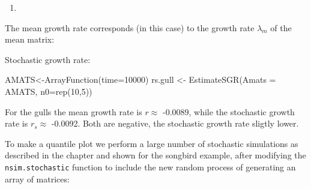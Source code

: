 \documentclass[
]{book}
\newenvironment{Shaded}{\begin{snugshade}}{\end{snugshade}}
\newcommand{\AttributeTok}[1]{\textcolor[rgb]{0.77,0.63,0.00}{#1}}
\newcommand{\DecValTok}[1]{\textcolor[rgb]{0.00,0.00,0.81}{#1}}
\newcommand{\FunctionTok}[1]{\textcolor[rgb]{0.00,0.00,0.00}{#1}}
\newcommand{\NormalTok}[1]{#1}
\newcommand{\OtherTok}[1]{\textcolor[rgb]{0.56,0.35,0.01}{#1}}
\newcommand{\SpecialCharTok}[1]{\textcolor[rgb]{0.00,0.00,0.00}{#1}}
\providecommand{\tightlist}{%
  \setlength{\itemsep}{0pt}\setlength{\parskip}{0pt}}
\begin{document}
\begin{enumerate}
\def\labelenumi{\arabic{enumi}.}
\setcounter{enumi}{2}
\tightlist
\item
\end{enumerate}

The mean growth rate corresponds (in this case) to the growth rate \(\lambda_m\) of the mean matrix:

\begin{Shaded}
\end{Shaded}

Stochastic growth rate:

\begin{Shaded}
\begin{Highlighting}[]
\NormalTok{AMATS}\OtherTok{\textless{}{-}}\FunctionTok{ArrayFunction}\NormalTok{(}\AttributeTok{time=}\DecValTok{10000}\NormalTok{)}
\NormalTok{rs.gull }\OtherTok{\textless{}{-}} \FunctionTok{EstimateSGR}\NormalTok{(}\AttributeTok{Amats =}\NormalTok{ AMATS, }\AttributeTok{n0=}\FunctionTok{rep}\NormalTok{(}\DecValTok{10}\NormalTok{,}\DecValTok{5}\NormalTok{))}
\end{Highlighting}
\end{Shaded}

For the gulls the mean growth rate is \(r\approx\) -0.0089, while the stochastic growth rate is \(r_s\approx\) -0.0092. Both are negative, the stochastic growth rate sligtly lower.

To make a quantile plot we perform a large number of stochastic simulations as described in the chapter and shown for the songbird example, after modifying the \texttt{nsim.stochastic} function to include the new random process of generating an array of matrices:
\end{document}
